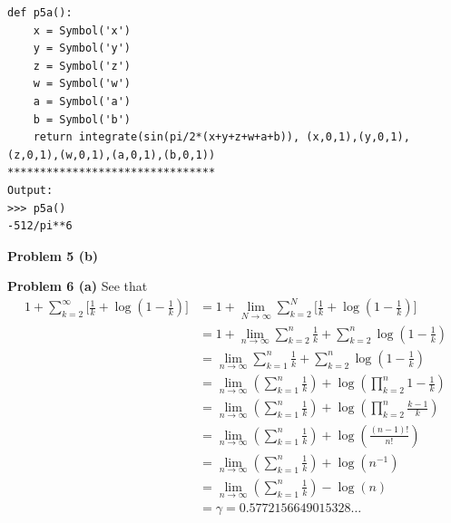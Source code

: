 \documentclass[12pt]{article}
\newcommand{\problem}[1]{\hspace{-4 ex} \large \textbf{Problem #1} }
\begin{document}
\begin{lstlisting}
def p5a():
	x = Symbol('x')
	y = Symbol('y')
	z = Symbol('z')
	w = Symbol('w')
	a = Symbol('a')
	b = Symbol('b')
	return integrate(sin(pi/2*(x+y+z+w+a+b)), (x,0,1),(y,0,1),
(z,0,1),(w,0,1),(a,0,1),(b,0,1))
********************************
Output:
>>> p5a()
-512/pi**6
\end{lstlisting}


\bigbreak
\problem{5 (b)}
	
\bigbreak
\problem{6 (a)} See that
\begin{align*}
	1 + \sum_{k=2}^\infty \Big [ \tfrac{1}{k} + \log(1-\tfrac{1}{k}) \Big] & = 1 + \lim_{N \to \infty} \sum_{k=2}^N \Big [ \tfrac{1}{k} + \log(1-\tfrac{1}{k}) \Big] \\
	& = 1 + \lim_{n \to \infty} \sum_{k=2}^n \tfrac{1}{k} + \sum_{k=2}^n \log(1-\tfrac{1}{k}) \\
	& = \lim_{n \to \infty} \sum_{k=1}^n \tfrac{1}{k} + \sum_{k=2}^n \log(1-\tfrac{1}{k}) \\
	& = \lim_{n \to \infty} \left( \sum_{k=1}^n \tfrac{1}{k} \right) + \log \left( \prod_{k=2}^n 1-\tfrac{1}{k} \right) \\
	& = \lim_{n \to \infty} \left( \sum_{k=1}^n \tfrac{1}{k} \right) + \log \left( \prod_{k=2}^n \tfrac{k-1}{k} \right) \\
	& = \lim_{n \to \infty} \left( \sum_{k=1}^n \tfrac{1}{k} \right) + \log \left( \frac{(n-1)!}{n!} \right) \\
	& = \lim_{n \to \infty} \left( \sum_{k=1}^n \tfrac{1}{k} \right) + \log \left( n^{-1} \right) \\
	& = \lim_{n \to \infty} \left( \sum_{k=1}^n \tfrac{1}{k} \right) - \log \left( n \right) \\
	& = \gamma = 0.5772156649015328\dots
\end{align*}
\end{document}
